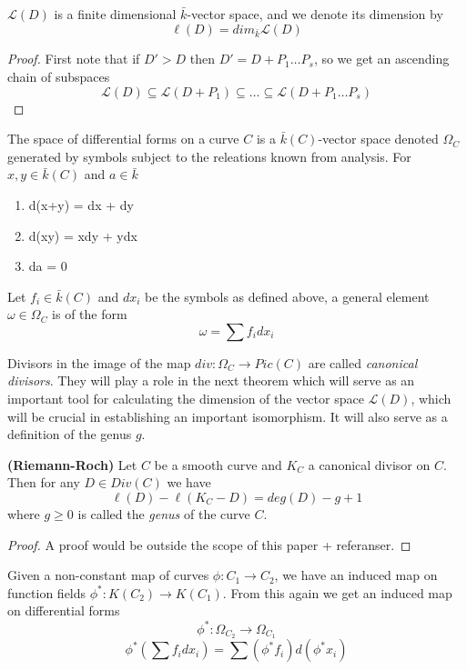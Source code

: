 \begin{prop}
 $\mathscr{L}(D)$ is a finite dimensional $\bar{k}$-vector space, and we denote
its dimension by
$$ \ell(D) = dim_{\bar{k}} \mathscr{L}(D) $$
\end{prop}
\begin{proof}
 First note that if $D' > D$ then $D' = D + P_1 \ldots P_s$, so we get an ascending chain of
subspaces
$$ \mathscr{L}(D) \subseteq \mathscr{L}(D+P_1) \subseteq \ldots \subseteq \mathscr{L}(D+P_1 \ldots P_s) $$

\end{proof}

\begin{mydef}
 The space of differential forms on a curve $C$ is a $\bar{k}(C)$-vector space denoted $\Omega_C$
generated by symbols subject to the releations known from analysis. 
For $x, y \in \bar{k}(C)$ and $a \in \bar{k}$
\begin{enumerate}
  \item d(x+y) = dx + dy
  \item d(xy) = xdy + ydx
  \item da = 0
\end{enumerate}
Let $f_i \in \bar{k}(C)$ and $dx_i$ be the symbols as defined above, a general
element $\omega \in \Omega_C$ is of the form
$$ \omega = \sum f_i dx_i $$
\end{mydef}

Divisors in the image of the map $div: \Omega_C \rightarrow Pic(C)$ are called
\emph{canonical divisors}. They will play a role in the next theorem which will
serve as an important tool for calculating the dimension of the vector space
$\mathscr{L}(D)$, which will be crucial in establishing an important isomorphism.
It will also serve as a definition of the genus $g$.

\begin{thm}
 \textbf{(Riemann-Roch)}
  Let $C$ be a smooth curve and $K_C$ a canonical divisor on $C$. Then for
any $D \in Div(C)$ we have
$$ \ell(D) - \ell(K_C - D) = deg(D) - g + 1 $$
where $g \geq 0$ is called the \emph{genus} of the curve $C$.
\end{thm}
\begin{proof}
 A proof would be outside the scope of this paper + referanser.
\end{proof}

Given a non-constant map of curves $\phi: C_1 \rightarrow C_2$, we have an induced map
on function fields $\phi^*: K(C_2) \rightarrow K(C_1)$. From this again we get an induced
map on differential forms
$$ \phi^*: \Omega_{C_2} \rightarrow \Omega_{C_1} $$
$$ \phi^*\left(\sum f_i dx_i\right) = \sum (\phi^* f_i) d(\phi^* x_i) $$

